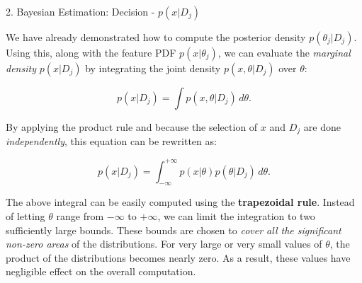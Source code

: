 \documentclass[aspectratio=169,xcolor=dvipsnames]{beamer}
\begin{document}
\begin{frame}{2. Bayesian Estimation: Decision - $p(x | D_j)$}

    We have already demonstrated how to compute the posterior density $p(\theta_j | D_j)$. Using this, along with the feature PDF $p(x | \theta_j)$, we can evaluate the \textit{marginal density} $p(x | D_j)$ by integrating the joint density $p(x, \theta | D_j)$ over $\theta$:

    \vspace{-5pt}

    $$ p(x | D_j) = \int p(x, \theta | D_j) \, d\theta. $$
    
    By applying the product rule and because the selection of
    $x$ and $D_j$ are done \textit{independently}, this equation can be rewritten as:

    \vspace{-5pt}
    
    $$ p(x | D_j) = \int_{-\infty}^{+\infty} p(x | \theta) p(\theta | D_j) \, d\theta. $$
    
    The above integral can be easily computed using the \textbf{trapezoidal rule}. Instead of letting $\theta$ range from $-\infty$ to $+\infty$, we can limit the integration to two sufficiently large bounds. These bounds are chosen to \textit{cover all the significant non-zero areas} of the distributions. For very large or very small values of $\theta$, the product of the distributions becomes nearly zero. As a result, these values have negligible effect on the overall computation.

\end{frame}

\end{document}
